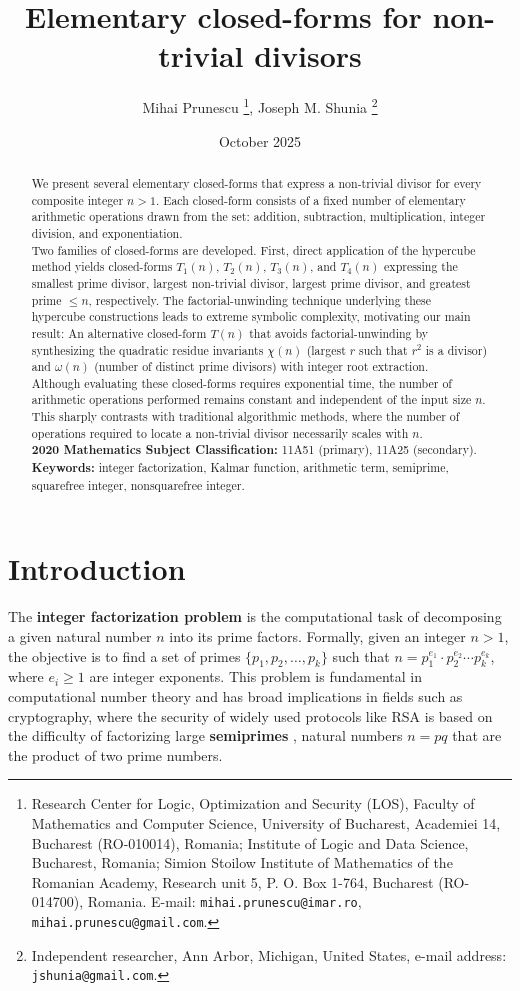 \documentclass[10pt]{article}
\title{Elementary closed-forms for non-trivial divisors}
\author{Mihai Prunescu \footnote{Research Center for Logic, Optimization and Security (LOS), Faculty of Mathematics and Computer Science, University of Bucharest, Academiei 14, Bucharest (RO-010014), Romania; Institute of Logic and Data Science, Bucharest, Romania; Simion Stoilow Institute of Mathematics of the Romanian Academy, Research unit 5, P. O. Box 1-764, Bucharest (RO-014700), Romania. E-mail: {\tt mihai.prunescu@imar.ro}, {\tt mihai.prunescu@gmail.com}.},
Joseph M. Shunia \footnote{Independent researcher, Ann Arbor, Michigan, United States, e-mail address: {\tt jshunia@gmail.com}.}
}
\date{October 2025}
\theoremstyle{plain}
\begin{document}
\maketitle

\begin{abstract} \noindent
We present several elementary closed-forms that express a non-trivial divisor for every composite integer $n > 1$. Each closed-form consists of a fixed number of elementary arithmetic operations drawn from the set:
addition, subtraction, multiplication, integer division, and exponentiation.
\\[2mm]
\noindent Two families of closed-forms are developed. First, direct application of the hypercube method yields closed-forms $T_1(n)$, $T_2(n)$, $T_3(n)$, and $T_4(n)$ expressing the smallest prime divisor,
largest non-trivial divisor, largest prime divisor, and greatest prime $\leq n$, respectively. The factorial-unwinding technique underlying these hypercube constructions leads to extreme symbolic complexity, motivating our main result: An alternative closed-form $T(n)$ that avoids factorial-unwinding by synthesizing the quadratic residue invariants $\chi(n)$ (largest $r$ such that $r^2$ is a divisor) and $\omega(n)$ (number of distinct prime divisors) with integer root extraction.
\\[2mm]
\noindent Although evaluating these closed-forms requires exponential time, the number of arithmetic operations performed remains constant and independent of the input size $n$. This sharply contrasts with traditional algorithmic methods, where the number of operations required to locate a non-trivial divisor necessarily scales with $n$.
\\[2mm]
{\bf 2020 Mathematics Subject Classification:} 11A51 (primary), 11A25 (secondary). \\[2mm]
{\bf Keywords:} integer factorization, Kalmar function, arithmetic term, semiprime, squarefree integer, nonsquarefree integer.
\end{abstract}

\section{Introduction}
The \textbf{integer factorization problem} is the computational task of decomposing a given natural number $n$ into its prime factors. Formally, given an integer $n > 1$, the objective is to find a set of primes $\{ p_1, p_2, \dots, p_k \}$ such that $n = p_1^{e_1} \cdot p_2^{e_2} \cdots p_k^{e_k}$, where $e_i \geq 1$ are integer exponents. This problem is fundamental in computational number theory and has broad implications in fields such as cryptography, where the security of widely used protocols like RSA is based on the difficulty of factorizing large \textbf{semiprimes} \cite{rivest1978rsa}, natural numbers $n=pq$ that are the product of two prime numbers.
\end{document}
